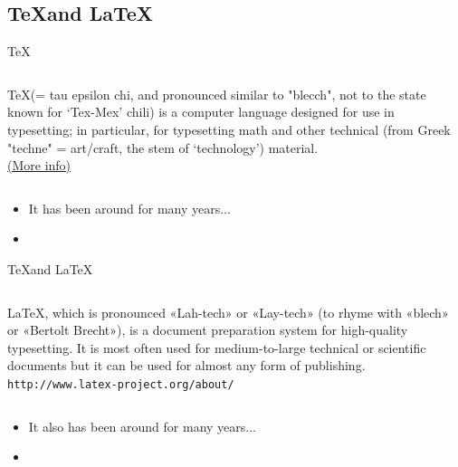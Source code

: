 \documentclass{beamer}
\begin{document}

\subsection{\TeX and \LaTeX}


\begin{frame}{\TeX}
	\begin{center}
	\begin{columns}
	\begin{block}{}
	\begin{center}
	\TeX (= tau epsilon chi, and pronounced similar to "blecch", not to the state known for `Tex-Mex' chili) is a computer language designed for use in typesetting; in particular, for typesetting math and other technical (from Greek "techne" = art/craft, the stem of `technology') material.\\
    \href{tug.org/whatis.html}{(More info)}
	\end{center}
	\end{block}
	\end{columns}
	\end{center}
	
      \begin{itemize}
	\item It has been around for many years...
	\item 
      \end{itemize}
\end{frame}



\begin{frame}{\TeX and \LaTeX}
	\begin{center}
	\begin{columns}
	\column{.95\textwidth}
	\begin{block}{}
	\begin{center}
	\LaTeX, which is pronounced «Lah-tech» or «Lay-tech» (to rhyme with «blech» or «Bertolt Brecht»), is a document preparation system for high-quality typesetting. It is most often used for medium-to-large technical or scientific documents but it can be used for almost any form of publishing.\\
	\texttt{http://www.latex-project.org/about/}
	\end{center}
	\end{block}
	\end{columns}
	\end{center}
	
      \begin{itemize}
	\item It also has been around for many years...
	\item 
      \end{itemize}
\end{frame}
\end{document}
